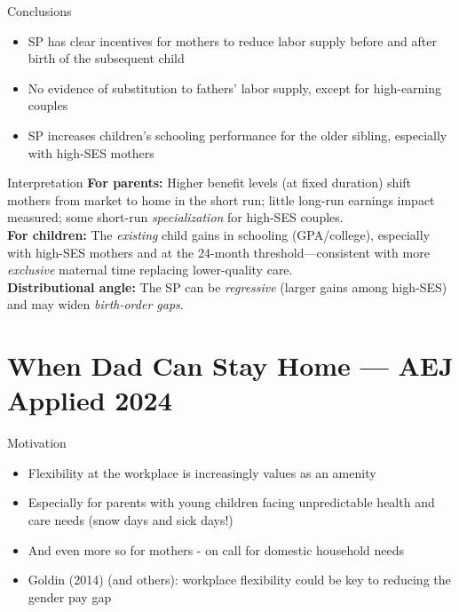 \documentclass[11pt,notes=hide,aspectratio=169,mathserif]{beamer}
\begin{document}
\begin{frame}{Conclusions}
\begin{itemize}
  \item SP has clear incentives for mothers to reduce labor supply before and after birth of the subsequent child
  \item No evidence of substitution to fathers' labor supply, except for high-earning couples
  \item SP increases children's schooling performance for the older sibling, especially with high-SES mothers
\end{itemize}
\end{frame}



\begin{frame}{Interpretation}
\small
\textbf{For parents:} Higher benefit levels (at fixed duration) shift mothers from market to home in the short run; little long-run earnings impact measured; some short-run \emph{specialization} for high-SES couples.\\[0.4em]
\textbf{For children:} The \emph{existing} child gains in schooling (GPA/college), especially with high-SES mothers and at the 24-month threshold—consistent with more \emph{exclusive} maternal time replacing lower-quality care.\\[0.4em]
\textbf{Distributional angle:} The SP can be \emph{regressive} (larger gains among high-SES) and may widen \emph{birth-order gaps}.
\end{frame}

\section{When Dad Can Stay Home — AEJ Applied 2024}


\begin{frame}{Motivation}
\begin{itemize}
  \item Flexibility at the workplace is increasingly values as an amenity 
    \item Especially for parents with young children facing unpredictable health and care needs (snow days and sick days!) 
    \item And even more so for mothers - on call for domestic household needs 
    \item Goldin (2014) (and others): workplace flexibility could be key to reducing the gender pay gap
\end{itemize}
\end{frame}
\end{document}
